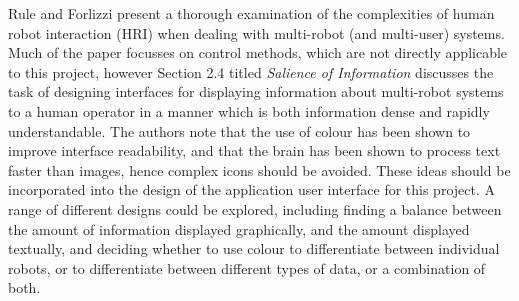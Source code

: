 \documentclass[titlepage,hidelinks,10pt]{article}
\begin{document}
Rule and Forlizzi\cite{DesginingInterfaces} present a thorough examination of the complexities of human robot interaction (HRI) when dealing with multi-robot (and multi-user) systems. Much of the paper focusses on control methods, which are not directly applicable to this project, however Section 2.4 titled \textit{Salience of Information} discusses the task of designing interfaces for displaying information about multi-robot systems to a human operator in a manner which is both information dense and rapidly understandable. The authors note that the use of colour has been shown to improve interface readability\cite{InterfaceColour}, and that the brain has been shown to process text faster than images\cite{InterfaceText}, hence complex icons should be avoided. These ideas should be incorporated into the design of the application user interface for this project. A range of different designs could be explored, including finding a balance between the amount of information displayed graphically, and the amount displayed textually, and deciding whether to use colour to differentiate between individual robots, or to differentiate between different types of data, or a combination of both.
\end{document}
